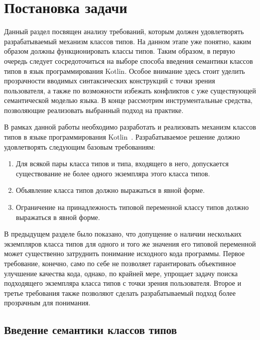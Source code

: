 \chapter{Постановка задачи \label{sct:problem-constraints}}

Данный раздел посвящен анализу требований, которым должен удовлетворять разрабатываемый механизм классов типов. На данном этапе уже понятно, каким образом должны функционировать классы типов. Таким образом, в первую очередь следует сосредоточиться на выборе способа введения семантики классов типов в язык программирования Kotlin. Особое внимание здесь стоит уделить прозрачности вводимых синтаксических конструкций с точки зрения пользователя, а также по возможности избежать конфликтов с уже существующей семантической моделью языка. В конце рассмотрим инструментальные средства, позволяющие реализовать выбранный подход на практике.

В рамках данной работы необходимо разработать и реализовать механизм классов типов в языке программирования Kotlin~\cite{kotlin}. Разрабатываемое решение должно удовлетворять следующим базовым требованиям:
\begin{enumerate}
    \item Для всякой пары класса типов и типа, входящего в него, допускается существование не более одного экземпляра этого класса типов.
    \item Объявление класса типов должно выражаться в явной форме.
    \item Ограничение на принадлежность типовой переменной классу типов должно выражаться в явной форме.
\end{enumerate} 
В предыдущем разделе было показано, что допущение о наличии нескольких экземпляров класса типов для одного и того же значения его типовой переменной может существенно затруднить понимание исходного кода программы. Первое требование, конечно, само по себе не позволяет гарантировать объективное улучшение качества кода, однако, по крайней мере, упрощает задачу поиска подходящего экземпляра класса типов с точки зрения пользователя. Второе и третье требования также позволяют сделать разрабатываемый подход более прозрачным для понимания. 

\section{Введение семантики классов типов \label{sct:problem-semantic}}

